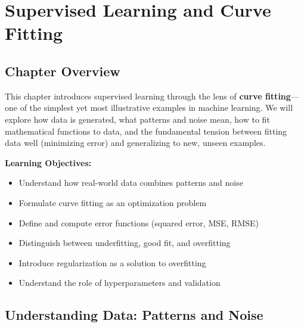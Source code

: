 
\chapter{Supervised Learning and Curve Fitting}
\label{ch:supervised_learning}


\section{Chapter Overview}

This chapter introduces supervised learning through the lens of \textbf{curve fitting}---one of the simplest yet most illustrative examples in machine learning. We will explore how data is generated, what patterns and noise mean, how to fit mathematical functions to data, and the fundamental tension between fitting data well (minimizing error) and generalizing to new, unseen examples.

\textbf{Learning Objectives:}
\begin{itemize}
    \item Understand how real-world data combines patterns and noise
    \item Formulate curve fitting as an optimization problem
    \item Define and compute error functions (squared error, MSE, RMSE)
    \item Distinguish between underfitting, good fit, and overfitting
    \item Introduce regularization as a solution to overfitting
    \item Understand the role of hyperparameters and validation
\end{itemize}


\section{Understanding Data: Patterns and Noise}

